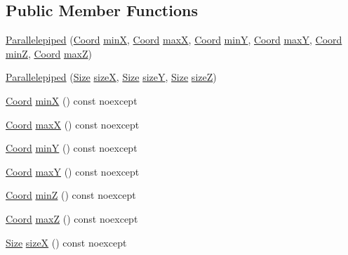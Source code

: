\subsection*{Public Member Functions}
\begin{DoxyCompactItemize}
\item 
\hyperlink{struct_parallelepiped_a9664be8176383a0886168a40aaf69d8f}{Parallelepiped} (\hyperlink{struct_coord}{Coord} \hyperlink{struct_parallelepiped_a8a429bb76e04899bbae19122281a7eb3}{min\-X}, \hyperlink{struct_coord}{Coord} \hyperlink{struct_parallelepiped_a26db75a30a94efca00824940cac2ec36}{max\-X}, \hyperlink{struct_coord}{Coord} \hyperlink{struct_parallelepiped_a901d57db13b000cbf7dcfb9e48bcdee2}{min\-Y}, \hyperlink{struct_coord}{Coord} \hyperlink{struct_parallelepiped_acbd192c1b0de23dbcd77187b290a777b}{max\-Y}, \hyperlink{struct_coord}{Coord} \hyperlink{struct_parallelepiped_aa2c6232df9facd31ecad0aad05697668}{min\-Z}, \hyperlink{struct_coord}{Coord} \hyperlink{struct_parallelepiped_a56212d5f8f3b8dba048416dd16dff541}{max\-Z})
\item 
\hyperlink{struct_parallelepiped_ac1d686565fe549db2954769470f238cc}{Parallelepiped} (\hyperlink{struct_size}{Size} \hyperlink{struct_parallelepiped_ae2e897abcd5d59d01fbb13ee43d8a915}{size\-X}, \hyperlink{struct_size}{Size} \hyperlink{struct_parallelepiped_a4dd40c102d8f16473ce2de8a5a93e102}{size\-Y}, \hyperlink{struct_size}{Size} \hyperlink{struct_parallelepiped_ab259bb38f5743f1f33738f4774b33848}{size\-Z})
\item 
\hyperlink{struct_coord}{Coord} \hyperlink{struct_parallelepiped_a8a429bb76e04899bbae19122281a7eb3}{min\-X} () const noexcept
\item 
\hyperlink{struct_coord}{Coord} \hyperlink{struct_parallelepiped_a26db75a30a94efca00824940cac2ec36}{max\-X} () const noexcept
\item 
\hyperlink{struct_coord}{Coord} \hyperlink{struct_parallelepiped_a901d57db13b000cbf7dcfb9e48bcdee2}{min\-Y} () const noexcept
\item 
\hyperlink{struct_coord}{Coord} \hyperlink{struct_parallelepiped_acbd192c1b0de23dbcd77187b290a777b}{max\-Y} () const noexcept
\item 
\hyperlink{struct_coord}{Coord} \hyperlink{struct_parallelepiped_aa2c6232df9facd31ecad0aad05697668}{min\-Z} () const noexcept
\item 
\hyperlink{struct_coord}{Coord} \hyperlink{struct_parallelepiped_a56212d5f8f3b8dba048416dd16dff541}{max\-Z} () const noexcept
\item 
\hyperlink{struct_size}{Size} \hyperlink{struct_parallelepiped_ae2e897abcd5d59d01fbb13ee43d8a915}{size\-X} () const noexcept

\end{DoxyCompactItemize}
